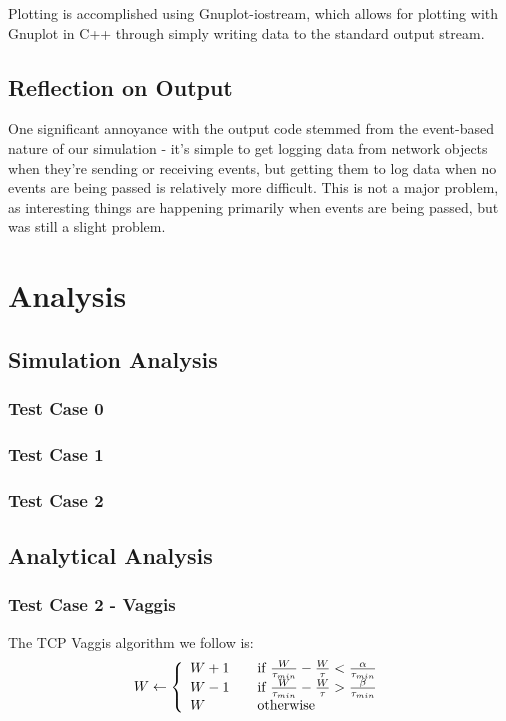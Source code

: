 \documentclass[12pt]{article}
\begin{document}
Plotting is accomplished using Gnuplot-iostream, which allows for plotting with Gnuplot in C++ through simply writing data to the standard output stream.

\subsection*{Reflection on Output}
One significant annoyance with the output code stemmed from the event-based nature of our simulation - it’s simple to get logging data from network objects when they’re sending or receiving events, but getting them to log data when no events are being passed is relatively more difficult. This is not a major problem, as interesting things are happening primarily when events are being passed, but was still a slight problem.


\section{Analysis}


\subsection{Simulation Analysis}
\subsubsection{Test Case 0}
\subsubsection{Test Case 1}
\subsubsection{Test Case 2}


\subsection{Analytical Analysis}
\subsubsection{Test Case 2 - Vaggis}


The TCP Vaggis algorithm we follow is:
\[ W \leftarrow \left\{
  \begin{array}{l l}
    W+1 & \quad \text{if }\frac{W}{\tau_{min}} - \frac{W}{\tau} < \frac{\alpha}{\tau_{min}}\\
    W-1 & \quad \text{if }\frac{W}{\tau_{min}} - \frac{W}{\tau} > \frac{\beta}{\tau_{min}}\\
    W & \quad \text{otherwise}\\
  \end{array} \right.\]
\end{document}
